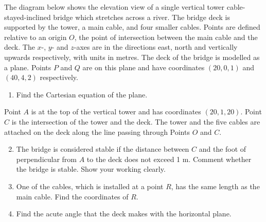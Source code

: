 \begin{problem}
    The diagram below shows the elevation view of a single vertical tower cable-stayed-inclined bridge which stretches across a river. The bridge deck is supported by the tower, a main cable, and four smaller cables. Points are defined relative to an origin $O$, the point of intersection between the main cable and the deck. The $x$-, $y$- and $z$-axes are in the directions east, north and vertically upwards respectively, with units in metres. The deck of the bridge is modelled as a plane. Points $P$ and $Q$ are on this plane and have coordinates $(20, 0, 1)$ and $(40, 4, 2)$ respectively.

    \begin{center}
    \end{center}

    \begin{enumerate}
        \item Find the Cartesian equation of the plane.
    \end{enumerate}

    Point $A$ is at the top of the vertical tower and has coordinates $(20, 1, 20)$. Point $C$ is the intersection of the tower and the deck. The tower and the five cables are attached on the deck along the line passing through Points $O$ and $C$.

    \begin{enumerate}
        \setcounter{enumi}{1}
        \item The bridge is considered stable if the distance between $C$ and the foot of perpendicular from $A$ to the deck does not exceed 1 m. Comment whether the bridge is stable. Show your working clearly.
        \item One of the cables, which is installed at a point $R$, has the same length as the main cable. Find the coordinates of $R$.
        \item Find the acute angle that the deck makes with the horizontal plane.
    \end{enumerate}
\end{problem}
